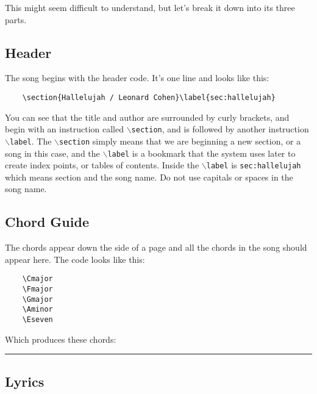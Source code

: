 \documentclass[16pt,a4paper,oneside]{book}
\newcommand{\Cmajor}{\marginpar{\chord{t}{o,o,o,3}{C}}}
\newcommand{\Fmajor}{\marginpar{\chord{t}{4,3,2,2}{F}}}
\newcommand{\Gmajor}{\marginpar{\chord{t}{o,2,3,2}{G}}}
\newcommand{\Aminor}{\marginpar{\chord{t}{2,o,o,o}{A\large{m}}}}
\newcommand{\Eseven}{\marginpar{\chord{t}{1,2,o,2}{E\large{7}}}}
\begin{document}
This might seem difficult to understand, but let's break it down into its three parts.


\subsection{Header} %
\label{sub:header}

The song begins with the header code. It's one line and looks like this:

\begin{verbatim}
	\section{Hallelujah / Leonard Cohen}\label{sec:hallelujah}
\end{verbatim}

You can see that the title and author are surrounded by curly brackets, and begin with an instruction called \texttt{$\backslash$section}, and is followed by another instruction \texttt{$\backslash$label}. The \texttt{$\backslash$section} simply means that we are beginning a new section, or a song in this case, and the \texttt{$\backslash$label} is a bookmark that the system uses later to create index points, or tables of contents. Inside the \texttt{$\backslash$label} is \texttt{sec:hallelujah} which means section and the song name. Do not use capitals or spaces in the song name.


\subsection{Chord Guide} %
\label{sub:chord_guide}
	
The chords appear down the side of a page and all the chords in the song should appear here. The code looks like this:

\begin{verbatim}
	\Cmajor
	\Fmajor
	\Gmajor
	\Aminor
	\Eseven
\end{verbatim}

Which produces these chords:\\
\hrule
\hfill	{}
\hfill	{}
\hfill	{}
\hfill	{}
\hfill	{}


\subsection{Lyrics} %
\label{sub:lyrics}
\end{document}
